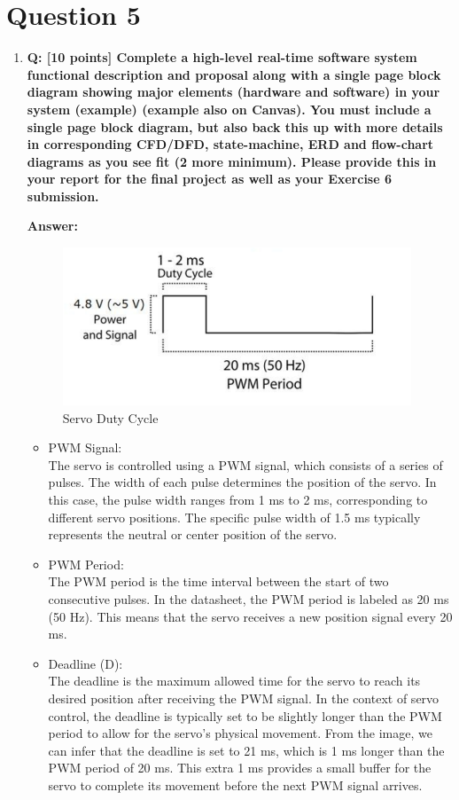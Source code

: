 \documentclass[a4paper,11pt]{article}%
\newenvironment{qanda}{\setlength{\parindent}{0pt}}{\bigskip}
\newcommand{\Q}{\bigskip\bfseries Q: }
\newcommand{\A}{\par\textbf{Answer: } \normalfont}
\begin{document}
\begin{qanda}
	\section{Question 5}
	\begin{enumerate}
		\item[] \Q [10 points] Complete a high-level real-time software system functional description and
			proposal along with a single page block diagram showing major elements (hardware and
			software) in your system (example) (example also on Canvas). You must include a single
			page block diagram, but also back this up with more details in corresponding CFD/DFD,
			state-machine, ERD and flow-chart diagrams as you see fit (2 more minimum). Please
			provide this in your report for the final project as well as your Exercise 6 submission.
			\A
			\begin{figure}[H]
				\centering
				\includegraphics[scale=0.60]{figures/dutycycle.png}
				\caption{Servo Duty Cycle}
			\end{figure}
			\begin{itemize}
				\item[]PWM Signal:\\
				The servo is controlled using a PWM signal, which consists of a series of pulses. The width of each pulse determines the position of the servo. In this case, the pulse width ranges from 1 ms to 2 ms, corresponding to different servo positions.	The specific pulse width of 1.5 ms typically represents the neutral or center position of the servo.
				\item[] PWM Period:\\
					The PWM period is the time interval between the start of two consecutive pulses. In the datasheet, the PWM period is labeled as 20 ms (50 Hz).	This means that the servo receives a new position signal every 20 ms.
				\item[] Deadline (D):\\
					The deadline is the maximum allowed time for the servo to reach its desired position after receiving the PWM signal. In the context of servo control, the deadline is typically set to be slightly longer than the PWM period to allow for the servo's physical movement. From the image, we can infer that the deadline is set to 21 ms, which is 1 ms longer than the PWM period of 20 ms. This extra 1 ms provides a small buffer for the servo to complete its movement before the next PWM signal arrives.

\end{itemize}
\end{enumerate}
\end{qanda}
\end{document}
